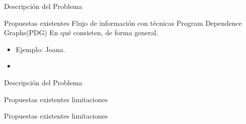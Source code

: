 \begin{frame}{Descripción del Problema}
\begin{block}{Propuestas existentes}
Flujo de información con técnicas Program Dependence Graphs(PDG)\newline
En qué consisten, de forma general.\newline
\begin{itemize}
	  \item  Ejemplo: Joana.
	  \item 
\end{itemize}	
\end{block}
\end{frame}


\begin{frame}{Descripción del Problema}
\begin{block}{Propuestas existentes limitaciones}
	
\end{block}
\begin{block}{Propuestas existentes limitaciones}

\end{block}
\end{frame}
